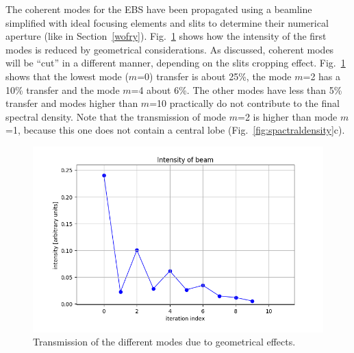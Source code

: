 \documentclass{iucr}              %
\begin{document}
The coherent modes for the EBS have been propagated using a beamline simplified with ideal focusing elements and slits to determine their numerical aperture (like in Section~\ref{wofry}). Fig.~\ref{fig:mode transmission} shows how the intensity of the first modes is reduced by geometrical considerations. 
As discussed, coherent modes will be ``cut'' in a different manner, depending on the slits cropping effect. Fig.~\ref{fig:mode transmission} shows that the lowest mode ($m$=0) transfer is about 25\%, the mode $m$=2 has a 10\% transfer and the mode $m$=4 about 6\%. The other modes have less than 5\% transfer and modes higher than $m$=10 practically do not contribute to the final spectral density. Note that the transmission of mode $m$=2 is higher than mode $m$=1, because this one does not contain a central lobe (Fig.~\ref{fig:spactraldensity}c).  

\begin{figure}\label{fig:mode transmission}
    \centering
        \includegraphics[width=\textwidth]{GRAPHICS/mode_transmission.png}
    \caption{Transmission of the different modes due to geometrical effects.}
\end{figure}
\end{document}
